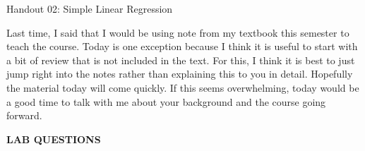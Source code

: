 \documentclass[12pt,hidelinks]{article}
\numberwithin{equation}{section}
\begin{document}
{\LARGE Handout 02: Simple Linear Regression}

\vspace*{18pt}

Last time, I said that I would be using note from my textbook this semester
to teach the course. Today is one exception because I think it is useful to
start with a bit of review that is not included in the text. For this, I think
it is best to just jump right into the notes rather than explaining this to
you in detail. Hopefully the material today will come quickly. If this seems
overwhelming, today would be a good time to talk with me about your background
and the course going forward.

% 

\newpage

\textbf{LAB QUESTIONS}

\vspace*{0pt}
\end{document}
